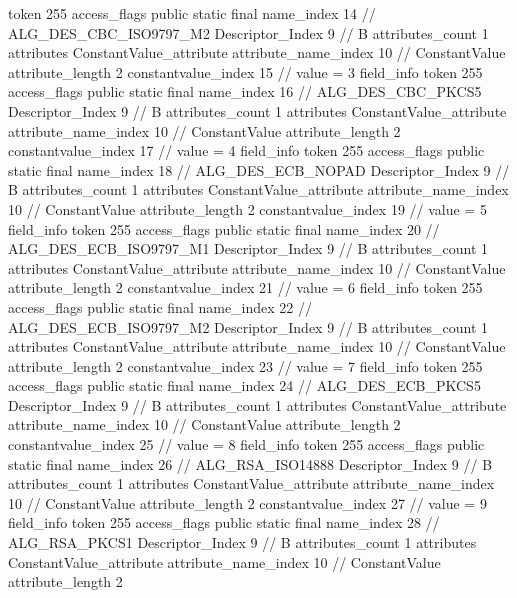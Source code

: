 {{{{{				token	255
				access_flags	public static final
				name_index	14		// ALG_DES_CBC_ISO9797_M2
				Descriptor_Index	9		// B
				attributes_count	1
				attributes {
				ConstantValue_attribute {
					attribute_name_index	10		// ConstantValue
					attribute_length	2
					constantvalue_index	15		// value = 3
				}
				}
			}
			field_info {
				token	255
				access_flags	public static final
				name_index	16		// ALG_DES_CBC_PKCS5
				Descriptor_Index	9		// B
				attributes_count	1
				attributes {
				ConstantValue_attribute {
					attribute_name_index	10		// ConstantValue
					attribute_length	2
					constantvalue_index	17		// value = 4
				}
				}
			}
			field_info {
				token	255
				access_flags	public static final
				name_index	18		// ALG_DES_ECB_NOPAD
				Descriptor_Index	9		// B
				attributes_count	1
				attributes {
				ConstantValue_attribute {
					attribute_name_index	10		// ConstantValue
					attribute_length	2
					constantvalue_index	19		// value = 5
				}
				}
			}
			field_info {
				token	255
				access_flags	public static final
				name_index	20		// ALG_DES_ECB_ISO9797_M1
				Descriptor_Index	9		// B
				attributes_count	1
				attributes {
				ConstantValue_attribute {
					attribute_name_index	10		// ConstantValue
					attribute_length	2
					constantvalue_index	21		// value = 6
				}
				}
			}
			field_info {
				token	255
				access_flags	public static final
				name_index	22		// ALG_DES_ECB_ISO9797_M2
				Descriptor_Index	9		// B
				attributes_count	1
				attributes {
				ConstantValue_attribute {
					attribute_name_index	10		// ConstantValue
					attribute_length	2
					constantvalue_index	23		// value = 7
				}
				}
			}
			field_info {
				token	255
				access_flags	public static final
				name_index	24		// ALG_DES_ECB_PKCS5
				Descriptor_Index	9		// B
				attributes_count	1
				attributes {
				ConstantValue_attribute {
					attribute_name_index	10		// ConstantValue
					attribute_length	2
					constantvalue_index	25		// value = 8
				}
				}
			}
			field_info {
				token	255
				access_flags	public static final
				name_index	26		// ALG_RSA_ISO14888
				Descriptor_Index	9		// B
				attributes_count	1
				attributes {
				ConstantValue_attribute {
					attribute_name_index	10		// ConstantValue
					attribute_length	2
					constantvalue_index	27		// value = 9
				}
				}
			}
			field_info {
				token	255
				access_flags	public static final
				name_index	28		// ALG_RSA_PKCS1
				Descriptor_Index	9		// B
				attributes_count	1
				attributes {
				ConstantValue_attribute {
					attribute_name_index	10		// ConstantValue
					attribute_length	2
}}}}}}}
